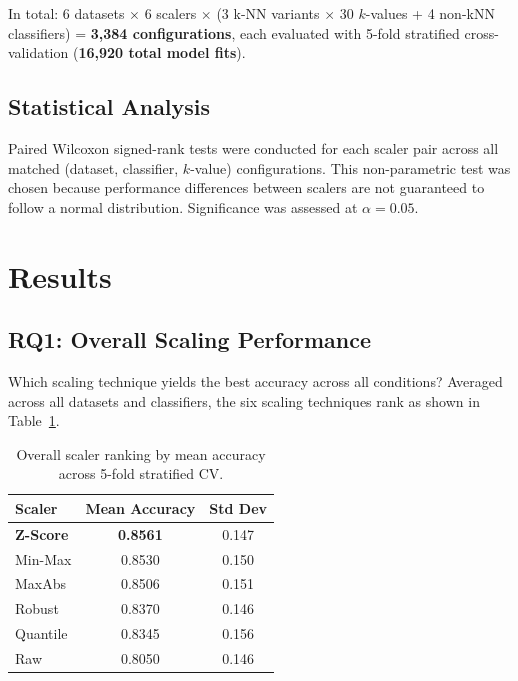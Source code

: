 \documentclass[12pt,a4paper]{article}
\begin{document}
In total: 6 datasets $\times$ 6 scalers $\times$ (3 k-NN variants $\times$ 30 $k$-values + 4 non-kNN classifiers) = \textbf{3,384 configurations}, each evaluated with 5-fold stratified cross-validation (\textbf{16,920 total model fits}).

\subsection{Statistical Analysis}
\label{sec:stats}

Paired Wilcoxon signed-rank tests \cite{amorim2023scaling} were conducted for each scaler pair across all matched (dataset, classifier, $k$-value) configurations. This non-parametric test was chosen because performance differences between scalers are not guaranteed to follow a normal distribution. Significance was assessed at $\alpha = 0.05$.

\section{Results}
\label{sec:results}

\subsection{RQ1: Overall Scaling Performance}
\label{sec:rq1}

Which scaling technique yields the best accuracy across all conditions? Averaged across all datasets and classifiers, the six scaling techniques rank as shown in Table~\ref{tbl:ranking}.

\begin{table}[ht]
\centering
\caption{Overall scaler ranking by mean accuracy across 5-fold stratified CV.}
\label{tbl:ranking}
\begin{tabular}{lcc}
\toprule
Scaler & Mean Accuracy & Std Dev \\
\midrule
\textbf{Z-Score} & \textbf{0.8561} & 0.147 \\
Min-Max          & 0.8530 & 0.150 \\
MaxAbs           & 0.8506 & 0.151 \\
Robust           & 0.8370 & 0.146 \\
Quantile         & 0.8345 & 0.156 \\
Raw              & 0.8050 & 0.146 \\
\bottomrule
\end{tabular}
\end{table}
\end{document}
